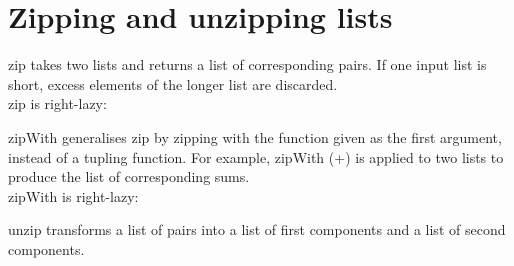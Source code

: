 \section{Zipping and unzipping lists}
zip takes two lists and returns a list of corresponding pairs. If one input list is short, excess elements of the longer list are discarded.\\
zip is right-lazy:
\skipped

zipWith generalises zip by zipping with the function given as the first argument, instead of a tupling function. For example, zipWith (+) is applied to two lists to produce the list of corresponding sums.\\
zipWith is right-lazy:
\skipped

unzip transforms a list of pairs into a list of first components and a list of second components.
\skipped
